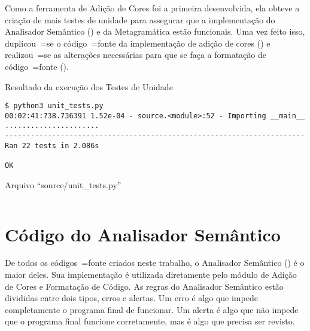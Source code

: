Como a ferramenta de Adição de Cores foi a primeira desenvolvida,
ela obteve a criação de mais testes de unidade para assegurar que a implementação do Analisador Semântico () e
da Metagramática estão funcionais.
Uma vez feito isso,
duplicou~=se o código~=fonte da implementação de adição de cores () e
realizou~=se as alterações necessárias para que se faça a formatação de código~=fonte ().
\begin{code}
\caption{Resultado da execução dos Testes de Unidade}
\label{unitTestsResults}
\begin{verbatim}
$ python3 unit_tests.py
00:02:41:738.736391 1.52e-04 - source.<module>:52 - Importing __main__
......................
----------------------------------------------------------------------
Ran 22 tests in 2.086s

OK
\end{verbatim}
\end{code}
\begin{code}
\caption{Arquivo ``source/unit\_tests.py''}
\label{unitTestsPy}
\inputminted[firstline=39,firstnumber=1]{python3}{../source/unit_tests.py}
\end{code}


\chapter[Analisador Semântico]{Código do Analisador Semântico}

De todos os códigos~=fonte criados neste trabalho,
o Analisador Semântico () é o maior deles.
Sua implementação é utilizada diretamente pelo módulo de Adição de Cores e
Formatação de Código.
As regras do Analisador Semântico estão divididas entre dois tipos,
erros e
alertas.
Um erro é algo que impede completamente o programa final de funcionar.
Um alerta é algo que não impede que o programa final funcione corretamente,
mas é algo que precisa ser revisto.

